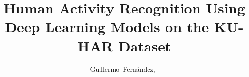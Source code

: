 \documentclass[journal]{IEEEtran}
\begin{document}



\title{Human Activity Recognition Using Deep Learning Models on the KU-HAR Dataset}


%

\author{Guillermo~Fernández,~
}

% 
%
\end{document}
